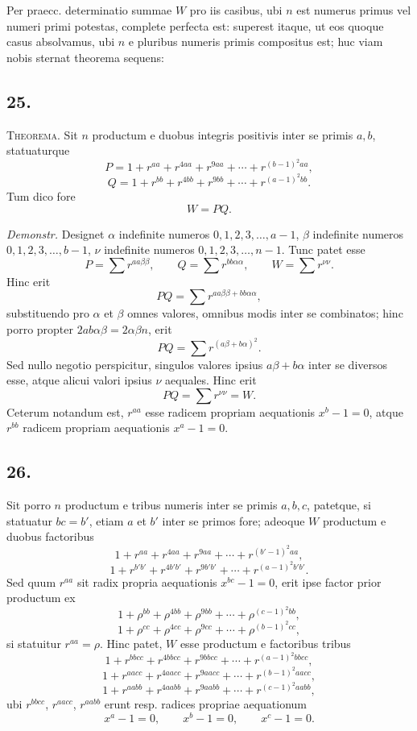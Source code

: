 \documentclass[12pt]{article}
\begin{document}
Per praecc. determinatio summae $W$ pro iis casibus, ubi $n$ est numerus primus vel numeri primi potestas, complete perfecta est: superest itaque, ut eos quoque casus absolvamus, ubi $n$ e pluribus numeris primis compositus est; huc viam nobis sternat theorema sequens:

\subsection*{25.}

\textsc{Theorema.} Sit $n$ productum e duobus integris positivis inter se primis $a,b$, statuaturque
\[
P=1+r^{aa}+r^{4aa}+r^{9aa}+\cdots+r^{(b-1)^2aa},
\]
\[
Q=1+r^{bb}+r^{4bb}+r^{9bb}+\cdots+r^{(a-1)^2bb}.
\]
Tum dico fore
\[
W=PQ.
\]

\emph{Demonstr.} Designet $\alpha$ indefinite numeros $0,1,2,3,\ldots,a-1$, $\beta$ indefinite numeros $0,1,2,3,\ldots,b-1$, $\nu$ indefinite numeros $0,1,2,3,\ldots,n-1$. Tunc patet esse
\[
P=\sum r^{aa\beta\beta},\qquad Q=\sum r^{bb\alpha\alpha},\qquad W=\sum r^{\nu\nu}.
\]
Hinc erit
\[
PQ=\sum r^{aa\beta\beta+bb\alpha\alpha},
\]
substituendo pro $\alpha$ et $\beta$ omnes valores, omnibus modis inter se combinatos; hinc porro propter $2ab\alpha\beta=2\alpha\beta n$, erit
\[
PQ=\sum r^{(a\beta+b\alpha)^2}.
\]
Sed nullo negotio perspicitur, singulos valores ipsius $a\beta+b\alpha$ inter se diversos esse, atque alicui valori ipsius $\nu$ aequales. Hinc erit
\[
PQ=\sum r^{\nu\nu}=W.
\]
Ceterum notandum est, $r^{aa}$ esse radicem propriam aequationis $x^b-1=0$, atque $r^{bb}$ radicem propriam aequationis $x^a-1=0$.

\subsection*{26.}

Sit porro $n$ productum e tribus numeris inter se primis $a,b,c$, patetque, si statuatur $bc=b'$, etiam $a$ et $b'$ inter se primos fore; adeoque $W$ productum e duobus factoribus
\[
1+r^{aa}+r^{4aa}+r^{9aa}+\cdots+r^{(b'-1)^2aa},
\]
\[
1+r^{b'b'}+r^{4b'b'}+r^{9b'b'}+\cdots+r^{(a-1)^2b'b'}.
\]
Sed quum $r^{aa}$ sit radix propria aequationis $x^{bc}-1=0$, erit ipse factor prior productum ex
\[
1+\rho^{bb}+\rho^{4bb}+\rho^{9bb}+\cdots+\rho^{(c-1)^2bb},
\]
\[
1+\rho^{cc}+\rho^{4cc}+\rho^{9cc}+\cdots+\rho^{(b-1)^2cc},
\]
si statuitur $r^{aa}=\rho$. Hinc patet, $W$ esse productum e factoribus tribus
\[
1+r^{bbcc}+r^{4bbcc}+r^{9bbcc}+\cdots+r^{(a-1)^2bbcc},
\]
\[
1+r^{aacc}+r^{4aacc}+r^{9aacc}+\cdots+r^{(b-1)^2aacc},
\]
\[
1+r^{aabb}+r^{4aabb}+r^{9aabb}+\cdots+r^{(c-1)^2aabb},
\]
ubi $r^{bbcc}$, $r^{aacc}$, $r^{aabb}$ erunt resp. radices propriae aequationum
\[
x^a-1=0,\qquad x^b-1=0,\qquad x^c-1=0.
\]
\end{document}

